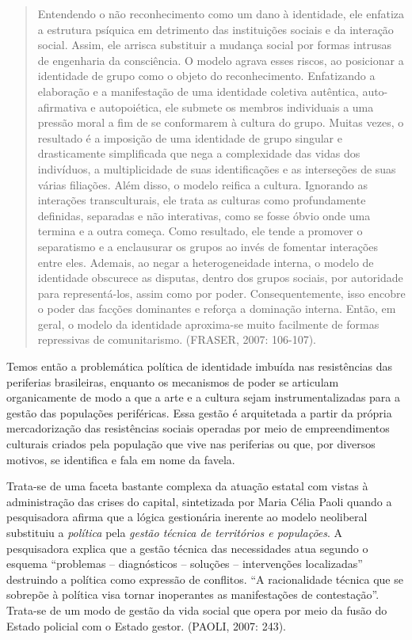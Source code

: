 \begin{quote}
Entendendo o não reconhecimento como um dano à identidade, ele enfatiza
a estrutura psíquica em detrimento das instituições sociais e da
interação social. Assim, ele arrisca substituir a mudança social por
formas intrusas de engenharia da consciência. O modelo agrava esses
riscos, ao posicionar a identidade de grupo como o objeto do
reconhecimento. Enfatizando a elaboração e a manifestação de uma
identidade coletiva autêntica, auto-afirmativa e autopoiética, ele
submete os membros individuais a uma pressão moral a fim de se
conformarem à cultura do grupo. Muitas vezes, o resultado é a imposição
de uma identidade de grupo singular e drasticamente simplificada que
nega a complexidade das vidas dos indivíduos, a multiplicidade de suas
identificações e as interseções de suas várias filiações. Além disso, o
modelo reifica a cultura. Ignorando as interações transculturais, ele
trata as culturas como profundamente definidas, separadas e não
interativas, como se fosse óbvio onde uma termina e a outra começa. Como
resultado, ele tende a promover o separatismo e a enclausurar os grupos
ao invés de fomentar interações entre eles. Ademais, ao negar a
heterogeneidade interna, o modelo de identidade obscurece as disputas,
dentro dos grupos sociais, por autoridade para representá-los, assim
como por poder. Consequentemente, isso encobre o poder das facções
dominantes e reforça a dominação interna. Então, em geral, o modelo da
identidade aproxima-se muito facilmente de formas repressivas de
comunitarismo. (FRASER, 2007: 106-107).
\end{quote}

Temos então a problemática política de identidade imbuída nas
resistências das periferias brasileiras, enquanto os mecanismos de poder
se articulam organicamente de modo a que a arte e a cultura sejam
instrumentalizadas para a gestão das populações periféricas. Essa gestão
é arquitetada a partir da própria mercadorização das resistências
sociais operadas por meio de empreendimentos culturais criados pela
população que vive nas periferias ou que, por diversos motivos, se
identifica e fala em nome da favela.

Trata-se de uma faceta bastante complexa da atuação estatal com vistas à
administração das crises do capital, sintetizada por Maria Célia Paoli
quando a pesquisadora afirma que a lógica gestionária inerente ao modelo
neoliberal substituiu a \emph{política} pela \emph{gestão técnica de
territórios e populações}. A pesquisadora explica que a gestão técnica
das necessidades atua segundo o esquema ``problemas -- diagnósticos --
soluções -- intervenções localizadas'' destruindo a política como
expressão de conflitos. ``A racionalidade técnica que se sobrepõe à
política visa tornar inoperantes as manifestações de contestação''.
Trata-se de um modo de gestão da vida social que opera por meio da fusão
do Estado policial com o Estado gestor. (PAOLI, 2007: 243).

